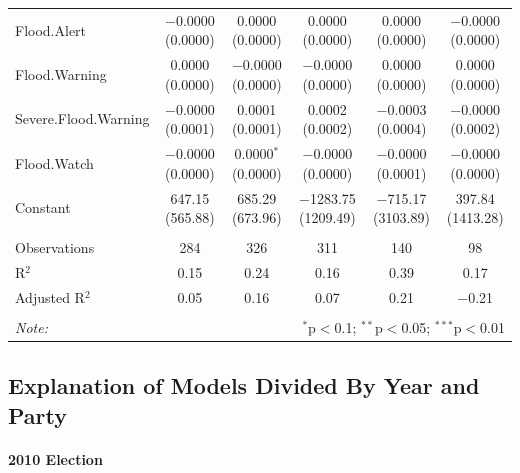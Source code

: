 \documentclass[12pt,letterpaper]{article}
\begin{document}
\begin{table}[!htbp]
\begin{adjustbox}{width=\textwidth}
\begin{tabular}{@{\extracolsep{5pt}}lccccc}
			Flood.Alert & $-$0.0000 (0.0000) & 0.0000 (0.0000) & 0.0000 (0.0000) & 0.0000 (0.0000) & $-$0.0000 (0.0000) \\ 
			Flood.Warning & 0.0000 (0.0000) & $-$0.0000 (0.0000) & $-$0.0000 (0.0000) & 0.0000 (0.0000) & 0.0000 (0.0000) \\ 
			Severe.Flood.Warning & $-$0.0000 (0.0001) & 0.0001 (0.0001) & 0.0002 (0.0002) & $-$0.0003 (0.0004) & $-$0.0000 (0.0002) \\ 
			Flood.Watch & $-$0.0000 (0.0000) & 0.0000$^{*}$ (0.0000) & $-$0.0000 (0.0000) & $-$0.0000 (0.0001) & $-$0.0000 (0.0000) \\ 
			Constant & 647.15 (565.88) & 685.29 (673.96) & $-$1283.75 (1209.49) & $-$715.17 (3103.89) & 397.84 (1413.28) \\ 
			\hline \\[-1.8ex] 
			Observations & 284 & 326 & 311 & 140 & 98 \\ 
			R$^{2}$ & 0.15 & 0.24 & 0.16 & 0.39 & 0.17 \\ 
			Adjusted R$^{2}$ & 0.05 & 0.16 & 0.07 & 0.21 & $-$0.21 \\ 
			\hline 
			\hline \\[-1.8ex] 
			\textit{Note:}  & \multicolumn{5}{r}{$^{*}$p$<$0.1; $^{**}$p$<$0.05; $^{***}$p$<$0.01} \\ 
		\end{tabular} 
	\end{adjustbox}
\end{table}


\subsection{Explanation of Models Divided By Year and Party}


\paragraph{2010 Election}
\end{document}
